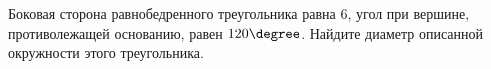 \begin{ex}
	\begin{condition}
		Боковая сторона равнобедренного треугольника равна \( 6 \), угол при вершине, противолежащей основанию, равен \( 120  \degree\). Найдите диаметр описанной окружности этого треугольника.
	\end{condition}
\end{ex}